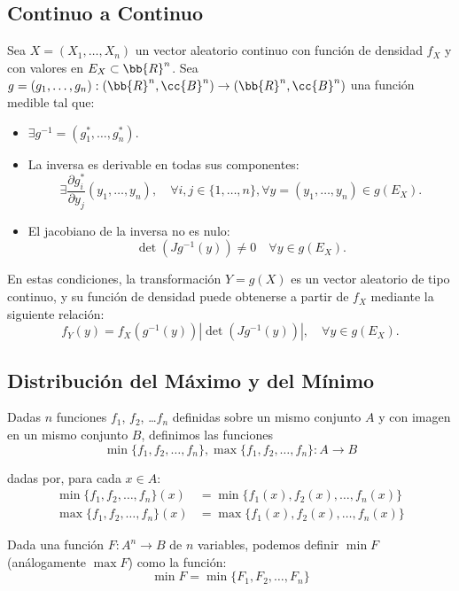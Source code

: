 \subsection{Continuo a Continuo}

Sea $X=(X_1, \ldots, X_n)$ un vector aleatorio continuo con función de densidad $f_X$ y con valores en $E_X\subset \bb{R}^n$. Sea $g=(g_1,\dots,g_n):(\bb{R}^n, \cc{B}^n)\to (\bb{R}^n, \cc{B}^n)$ una función medible tal que:
\begin{itemize}
    \item $\exists g^{-1}=\left(g_1^{\ast},\dots,g_n^{\ast}\right)$.
    \item La inversa es derivable en todas sus componentes:
    \begin{equation*}
        \exists \dfrac{\partial g_i^{\ast}}{\partial y_j}(y_1,\dots,y_n),\quad \forall i,j\in \{1,\dots,n\},\forall y=(y_1,\dots,y_n)\in g(E_X).
    \end{equation*}
    \item El jacobiano de la inversa no es nulo:
    \begin{equation*}
        \det(Jg^{-1}(y))\neq 0 \quad \forall y\in g(E_X).
    \end{equation*}
\end{itemize}

En estas condiciones, la transformación $Y=g(X)$ es un vector aleatorio de tipo continuo, y su función de densidad puede obtenerse a partir de $f_X$ mediante la siguiente relación:
\begin{equation*}
    f_Y(y) = f_X(g^{-1}(y)) \left|\det(Jg^{-1}(y))\right|, \quad \forall y\in g(E_X).
\end{equation*}


\subsection{Distribución del Máximo y del Mínimo}

\begin{definicion}
    Dadas $n$ funciones $f_1$, $f_2$, \ldots $f_n$ definidas sobre un mismo conjunto $A$ y con imagen en un mismo conjunto $B$, definimos las funciones 
    \begin{equation*}
        \min\{f_1,f_2,\ldots,f_n\},\max\{f_1,f_2,\ldots,f_n\}:A\rightarrow B
    \end{equation*}

    dadas por, para cada $x\in A$:
    \begin{align*}
        \min\{f_1,f_2,\ldots,f_n\}(x) &= \min\{f_1(x),f_2(x),\ldots,f_n(x)\} \\
        \max\{f_1,f_2,\ldots,f_n\}(x) &= \max\{f_1(x),f_2(x),\ldots,f_n(x)\}
    \end{align*}
\end{definicion}
Dada una función $F:A^n\rightarrow B$ de $n$ variables, podemos definir $\min F$ (análogamente $\max F$) como la función:
\begin{equation*}
    \min F = \min\{F_1,F_2,\ldots,F_n\}
\end{equation*}


